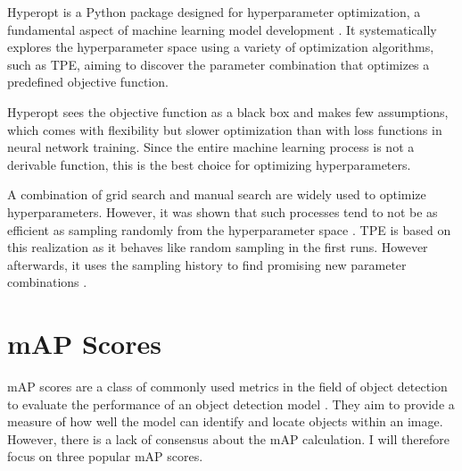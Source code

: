 \documentclass[10pt]{book}
\begin{document}
Hyperopt is a Python package designed for hyperparameter optimization, a fundamental aspect of machine learning model development \cite{bergstra2013making}. It systematically explores the hyperparameter space using a variety of optimization algorithms, such as \ac{TPE}, aiming to discover the parameter combination that optimizes a predefined objective function. 

Hyperopt sees the objective function as a black box and makes few assumptions, which comes with flexibility but slower optimization than with loss functions in neural network training. Since the entire machine learning process is not a derivable function, this is the best choice for optimizing hyperparameters.

A combination of grid search and manual search are widely used to optimize hyperparameters. However, it was shown that such processes tend to not be as efficient as sampling randomly from the hyperparameter space \cite{bergstra2012random}. \ac{TPE} is based on this realization as it behaves like random sampling in the first runs. However afterwards, it uses the sampling history to find promising new parameter combinations \cite{bergstra2011algorithms}. 



\section{mAP Scores}

\ac{mAP} scores are a class of commonly used metrics in the field of object detection to evaluate the performance of an object detection model \cite{padilla2020survey}. They aim to provide a measure of how well the model can identify and locate objects within an image. However, there is a lack of consensus about the \ac{mAP} calculation. I will therefore focus on three popular \ac{mAP} scores. 
\end{document}
